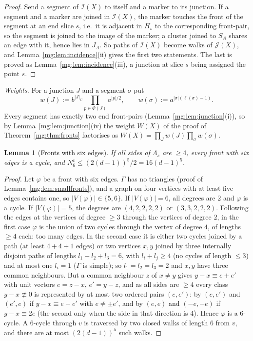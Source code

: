 \documentclass[11pt,a4paper]{article}
\newtheorem{lemma}[theorem]{Lemma}
\theoremstyle{definition}
\theoremstyle{remark}
\begin{document}
\begin{proof}
Send a segment of $\mathcal I(X)$ to itself and a marker to its junction. If a segment and a marker are joined in $\mathcal I(X)$, the marker touches
the front of the segment at an end slice $s$, i.e.\ it is adjacent in $H_s$ to the corresponding front-pair, so the segment is joined to the image of the
marker; a cluster joined to $S_A$ shares an edge with it, hence lies in $J_A$. So paths of $\mathcal I(X)$ become walks of $\mathcal J(X)$, and
Lemma~\ref{mg:lem:incidence}(ii) gives the first two statements. The last is proved as Lemma~\ref{mg:lem:incidence}(iii), a junction at slice $s$
being assigned the point $s$.
\end{proof}

\emph{Weights.} For a junction $J$ and a segment $\sigma$ put
\[
w(J):=b^{|J|_C}\prod_{p\in\Phi(J)}a^{|p|/2},\qquad w(\sigma):=a^{|\sigma|(\ell(\sigma)-1)} .
\]
Every segment has exactly two end front-pairs (Lemma~\ref{mg:lem:junction}(i)), so by Lemma~\ref{mg:lem:junction}(iv) the weight $W(X)$ of the proof of
Theorem~\ref{mg:thm:fronts} factorises as $W(X)=\prod_Jw(J)\prod_\sigma w(\sigma)$.

\begin{lemma}[Fronts with six edges]\label{mg:lem:sixfronts}
If all sides of $\Lambda_s$ are $\ge4$, every front with six edges is a cycle, and $N^v_6\le(2(d-1))^5/2=16(d-1)^5$.
\end{lemma}

\begin{proof}
Let $\varphi$ be a front with six edges. $\Gamma$ has no triangles (proof of Lemma~\ref{mg:lem:smallfronts}), and a graph on four vertices with at
least five edges contains one, so $|V(\varphi)|\in\{5,6\}$. If $|V(\varphi)|=6$, all degrees are $2$ and $\varphi$ is a cycle. If $|V(\varphi)|=5$, the degrees
are $(4,2,2,2,2)$ or $(3,3,2,2,2)$. Following the edges at the vertices of degree $\ge3$ through the vertices of degree $2$, in the first case $\varphi$
is the union of two cycles through the vertex of degree $4$, of lengths $\ge4$ each: too many edges. In the second case it is either two cycles joined
by a path (at least $4+4+1$ edges) or two vertices $x,y$ joined by three internally disjoint paths of lengths $l_1+l_2+l_3=6$, with $l_i+l_j\ge4$ (no
cycles of length $\le3$) and at most one $l_i=1$ ($\Gamma$ is simple); so $l_1=l_2=l_3=2$ and $x,y$ have three common neighbours. But a common
neighbour $z$ of $x\ne y$ gives $y-x\equiv e+e'$ with unit vectors $e=z-x$, $e'=y-z$, and as all sides are $\ge4$ every class $y-x\not\equiv0$ is
represented by at most two ordered pairs $(e,e')$: by $(e,e')$ and $(e',e)$ if $y-x\equiv e+e'$ with $e\ne\pm e'$, and by $(e,e)$ and $(-e,-e)$ if
$y-x\equiv2e$ (the second only when the side in that direction is $4$). Hence $\varphi$ is a $6$-cycle. A $6$-cycle through $v$ is traversed by two closed
walks of length $6$ from $v$, and there are at most $(2(d-1))^5$ such walks.
\end{proof}
\end{document}
